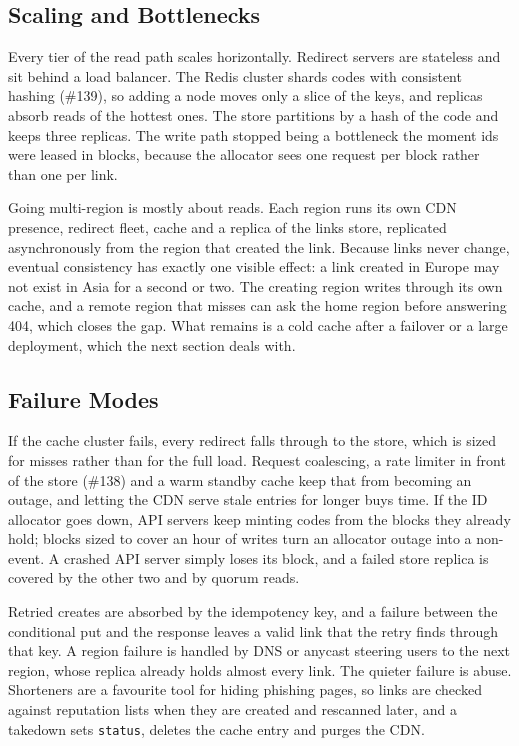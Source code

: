 \documentclass[
  letterpaper,
  oneside,
  11pt,
  openany]{scrbook}
\begin{document}
\subsection{Scaling and Bottlenecks}\label{scaling-and-bottlenecks}

Every tier of the read path scales horizontally. Redirect servers are
stateless and sit behind a load balancer. The Redis cluster shards codes
with consistent hashing (\#139), so adding a node moves only a slice of
the keys, and replicas absorb reads of the hottest ones. The store
partitions by a hash of the code and keeps three replicas. The write
path stopped being a bottleneck the moment ids were leased in blocks,
because the allocator sees one request per block rather than one per
link.

Going multi-region is mostly about reads. Each region runs its own CDN
presence, redirect fleet, cache and a replica of the links store,
replicated asynchronously from the region that created the link. Because
links never change, eventual consistency has exactly one visible effect:
a link created in Europe may not exist in Asia for a second or two. The
creating region writes through its own cache, and a remote region that
misses can ask the home region before answering 404, which closes the
gap. What remains is a cold cache after a failover or a large
deployment, which the next section deals with.

\subsection{Failure Modes}\label{failure-modes}

If the cache cluster fails, every redirect falls through to the store,
which is sized for misses rather than for the full load. Request
coalescing, a rate limiter in front of the store (\#138) and a warm
standby cache keep that from becoming an outage, and letting the CDN
serve stale entries for longer buys time. If the ID allocator goes down,
API servers keep minting codes from the blocks they already hold; blocks
sized to cover an hour of writes turn an allocator outage into a
non-event. A crashed API server simply loses its block, and a failed
store replica is covered by the other two and by quorum reads.

Retried creates are absorbed by the idempotency key, and a failure
between the conditional put and the response leaves a valid link that
the retry finds through that key. A region failure is handled by DNS or
anycast steering users to the next region, whose replica already holds
almost every link. The quieter failure is abuse. Shorteners are a
favourite tool for hiding phishing pages, so links are checked against
reputation lists when they are created and rescanned later, and a
takedown sets \texttt{status}, deletes the cache entry and purges the
CDN.
\end{document}
